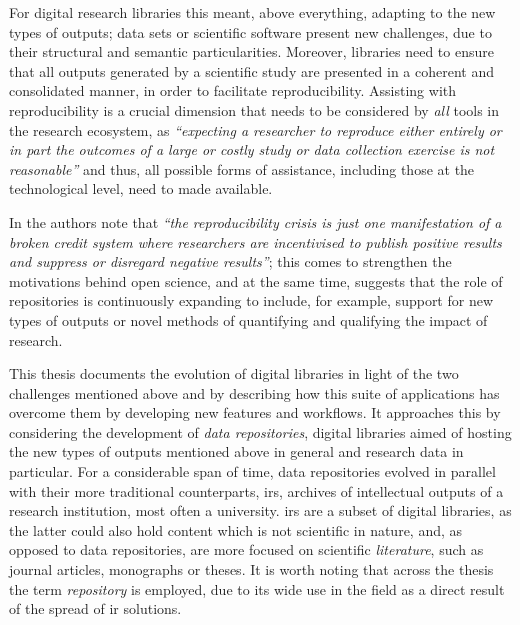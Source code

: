 For digital research libraries this meant, above everything, adapting to the new types of outputs; data sets or scientific software present new challenges, due to their structural and semantic particularities. Moreover, libraries need to ensure that all outputs generated by a scientific study are presented in a coherent and consolidated manner, in order to facilitate reproducibility. Assisting with reproducibility is a crucial dimension that needs to be considered by \emph{all} tools in the research ecosystem, as \emph{``expecting a researcher to reproduce either entirely or in part the outcomes of a large or costly study or data collection exercise is not reasonable''}\cite{oa} and thus, all possible forms of assistance, including those at the technological level, need to made available.

In \cite{oa} the authors note that \emph{``the reproducibility crisis is just one manifestation of a broken credit system where researchers are incentivised to publish positive results and suppress or disregard negative results''}; this comes to strengthen the motivations behind open science, and at the same time, suggests that the role of repositories is continuously expanding to include, for example, support for new types of outputs or novel methods of quantifying and qualifying the impact of research.

This thesis documents the evolution of digital libraries in light of the two challenges mentioned above and by describing how this suite of applications has overcome them by developing new features and workflows. It approaches this by considering the development of \emph{data repositories}, digital libraries aimed of hosting the new types of outputs mentioned above in general and research data in particular. For a considerable span of time, data repositories evolved in parallel with their more traditional counterparts, \glspl{ir}, archives of intellectual outputs of a research institution, most often a university. \glspl{ir} are a subset of digital libraries, as the latter could also hold content which is not scientific in nature, and, as opposed to data repositories, are more focused on scientific \emph{literature}, such as journal articles, monographs or theses. It is worth noting that across the thesis the term \emph{repository} is employed, due to its wide use in the field as a direct result of the spread of \gls{ir} solutions.

